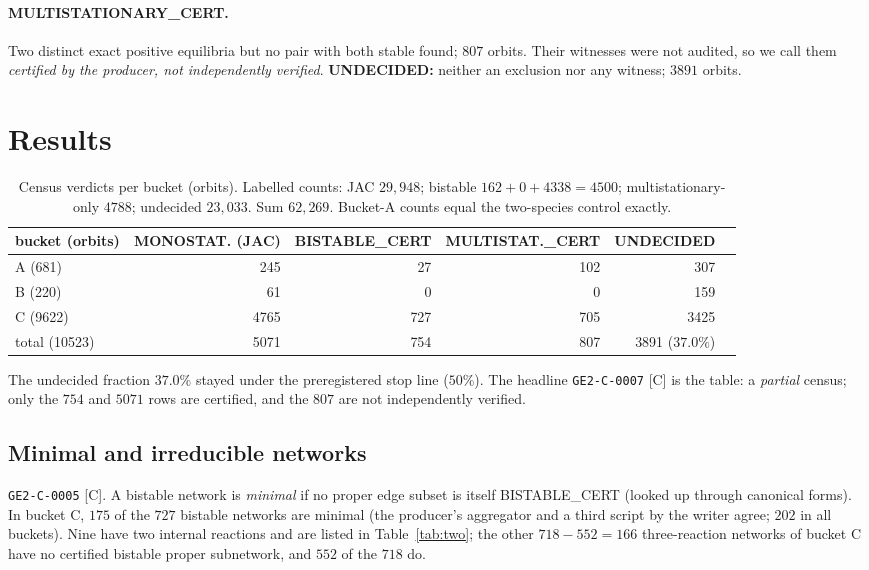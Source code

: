 \documentclass[11pt]{article}
\newcommand{\tier}[1]{\textsf{[#1]}}
\newcommand{\tC}{\tier{C}}
\begin{document}
\paragraph{MULTISTATIONARY\_CERT.} Two distinct exact positive equilibria but no pair with both stable found; $807$ orbits. Their witnesses were not audited, so we call them \emph{certified by the producer, not independently verified}. \textbf{UNDECIDED:} neither an exclusion nor any witness; $3891$ orbits.

\section{Results}\label{sec:results}
\begin{table}[h]\centering\small
\begin{tabular}{lrrrrr}\toprule
bucket (orbits) & MONOSTAT. (JAC) & BISTABLE\_CERT & MULTISTAT.\_CERT & UNDECIDED\\\midrule
A (681) & 245 & 27 & 102 & 307\\
B (220) & 61 & 0 & 0 & 159\\
C (9622) & 4765 & 727 & 705 & 3425\\\midrule
total (10523) & 5071 & 754 & 807 & 3891 ($37.0\%$)\\\bottomrule
\end{tabular}
\caption{Census verdicts per bucket (orbits). Labelled counts: JAC $29{,}948$; bistable $162+0+4338=4500$; multistationary-only $4788$; undecided $23{,}033$. Sum $62{,}269$. Bucket-A counts equal the two-species control exactly.}\label{tab:main}
\end{table}
The undecided fraction $37.0\%$ stayed under the preregistered stop line ($50\%$). The headline \texttt{GE2-C-0007} \tC{} is the table: a \emph{partial} census; only the $754$ and $5071$ rows are certified, and the $807$ are not independently verified.

\subsection{Minimal and irreducible networks}\label{sec:struct}
\texttt{GE2-C-0005} \tC{}. A bistable network is \emph{minimal} if no proper edge subset is itself BISTABLE\_CERT (looked up through canonical forms). In bucket C, $175$ of the $727$ bistable networks are minimal (the producer's aggregator and a third script by the writer agree; $202$ in all buckets). Nine have two internal reactions and are listed in Table~\ref{tab:two}; the other $718-552=166$ three-reaction networks of bucket C have no certified bistable proper subnetwork, and $552$ of the $718$ do.
\end{document}
